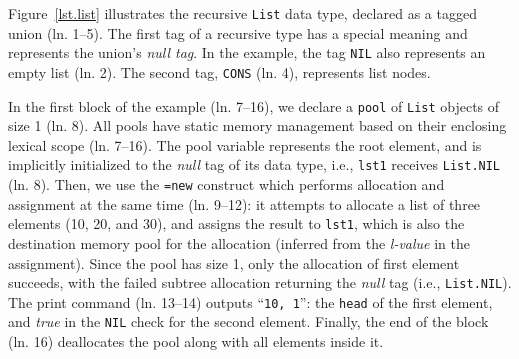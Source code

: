 \documentclass{sig-alternate}
\newcommand{\CEU}{\textsc{C\'{e}u}\xspace}
\newcommand{\code}[1] {{\small{\texttt{#1}}}}
\begin{document}
Figure~\ref{lst.list} illustrates the recursive \code{List} data type,
declared as a tagged union (ln. 1--5).
The first tag of a recursive type has a special meaning and represents the 
union's \emph{null tag}.
In the example, the tag \code{NIL} also represents an empty list (ln. 2).
The second tag, \code{CONS} (ln. 4), represents list nodes.

In the first block of the example (ln. 7--16), we declare a \code{pool} of 
\code{List} objects of size 1 (ln. 8).
%
All pools have static memory management based on their enclosing lexical scope (ln.  
7--16).
%
The pool variable represents the root element, and is implicitly 
initialized to the \emph{null} tag of its data type, i.e., 
\code{lst1} receives \code{List.NIL} (ln. 8).
%
Then, we use the \code{=new} construct which performs
allocation and assignment at the same time (ln. 9--12):
it attempts to allocate a list of three elements (10, 20, and 30),
and assigns the result to \code{lst1}, which is also the destination memory 
pool for the allocation (inferred from the \emph{l-value} in the assignment).
%
Since the pool has size 1, only the allocation of first element succeeds, with 
the failed subtree allocation returning the \emph{null} tag (i.e., 
\code{List.NIL}).
The print command (ln. 13--14) outputs ``\texttt{10, 1}'': the \code{head} of 
the first element, and \emph{true} in the \code{NIL} check for the second 
element.
%
Finally, the end of the block (ln. 16) deallocates the pool along with all 
elements inside it.
\end{document}
